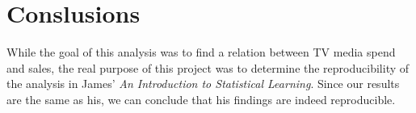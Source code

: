 \documentclass[12pt]{article}
\begin{document}
\section{Conslusions}

While the goal of this analysis was to find a relation between TV media spend and sales, the real purpose of this project was to determine the reproducibility of the analysis in James' \textit{An Introduction to Statistical Learning}. Since our results are the same as his, we can conclude that his findings are indeed reproducible.
\end{document}
